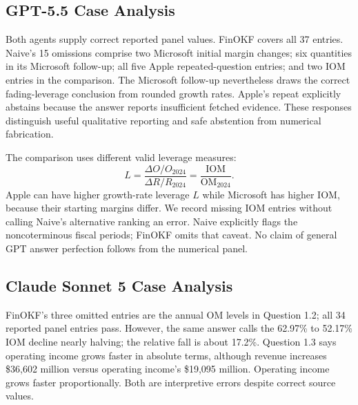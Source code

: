 \documentclass[letterpaper]{article} %
\begin{document}
\begin{table}[t]
\centering

\caption{Per-question audit. C: correct; E: incorrect or inconsistent; O: omitted. Dashes denote a no-text failed execution, not an omission or zero cost. All models use the same per-question denominator.}
\label{tab:question-audit}
\end{table}

\subsection{GPT-5.5 Case Analysis}
Both agents supply correct reported panel values. FinOKF covers all 37 entries. Naive's 15 omissions comprise two Microsoft initial margin changes; six quantities in its Microsoft follow-up; all five Apple repeated-question entries; and two IOM entries in the comparison. The Microsoft follow-up nevertheless draws the correct fading-leverage conclusion from rounded growth rates. Apple's repeat explicitly abstains because the answer reports insufficient fetched evidence. These responses distinguish useful qualitative reporting and safe abstention from numerical fabrication.

The comparison uses different valid leverage measures:
\begin{equation}
L=\frac{\Delta O/O_{2024}}{\Delta R/R_{2024}}
 =\frac{\mathrm{IOM}}{\mathrm{OM}_{2024}}.
\end{equation}
Apple can have higher growth-rate leverage $L$ while Microsoft has higher IOM, because their starting margins differ. We record missing IOM entries without calling Naive's alternative ranking an error. Naive explicitly flags the noncoterminous fiscal periods; FinOKF omits that caveat. No claim of general GPT answer perfection follows from the numerical panel.

\subsection{Claude Sonnet 5 Case Analysis}
FinOKF's three omitted entries are the annual OM levels in Question 1.2; all 34 reported panel entries pass. However, the same answer calls the 62.97\% to 52.17\% IOM decline nearly halving; the relative fall is about 17.2\%. Question 1.3 says operating income grows faster in absolute terms, although revenue increases \$36,602 million versus operating income's \$19,095 million. Operating income grows faster proportionally. Both are interpretive errors despite correct source values.
\end{document}
